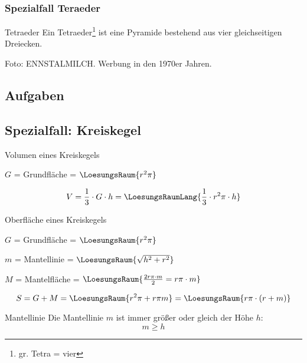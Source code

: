 \subsubsection{Spezialfall Teraeder}

\begin{definition}{Tetraeder}{}
  Ein Tetraeder\footnote{gr. Tetra = vier} ist eine Pyramide bestehend
  aus vier gleichseitigen Dreiecken.
\end{definition}

\begin{center}\tiny{Foto: ENNSTALMILCH. Werbung in den 1970er Jahren.}\end{center}
\subsection*{Aufgaben}

\newpage

\subsection{Spezialfall: Kreiskegel}



\begin{gesetz}{Volumen eines Kreiskegels}{}

  $G$ = Grundfläche = $\LoesungsRaum{r^2\pi}$

  $$V = \frac13\cdot{} G\cdot{}h = \LoesungsRaumLang{\frac13 \cdot{} r^2\pi \cdot{} h}$$
\end{gesetz}



\begin{gesetz}{Oberfläche eines Kreiskegels}{}

  $G$ = Grundfläche = $\LoesungsRaum{r^2\pi}$

  $m$ = Mantellinie = $\LoesungsRaum{\sqrt{h^2 + r^2}}$
  
  $M$ = Mantelfläche = $\LoesungsRaum{\frac{2r\pi \cdot{} m}2 = r\pi\cdot{}m}$
  
  $$S = G + M = \LoesungsRaum{r^2\pi + r\pi m} = \LoesungsRaum{r\pi\cdot{}(r+m)}$$
\end{gesetz}


\begin{bemerkung}{Mantellinie}{}
  Die Mantellinie $m$ ist immer größer oder gleich der Höhe $h$:
  $$m \ge{} h$$
\end{bemerkung}

